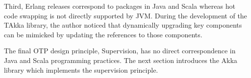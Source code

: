 Third, Erlang releases correspond to  packages in Java and Scala whereas hot 
code swapping is not directly supported by JVM.  During the development of the 
TAkka library, the author noticed that dynamically upgrading key components can 
be mimicked by updating the references to those components.

The final OTP design principle, Supervision, has no direct correspondence in 
Java and Scala programming practices.  The next section introduces the Akka 
library which implements the supervision principle.






\begin{comment}

\section{The Erlang Programming Language}

Erlang \citep{erlang_history, ArmstrongErlang} is a dynamically typed 
functional programming language originally designed at the Ericsson Computer 
Science Laboratory for implementing telephony applications 
\citep{erlang_history}.  After using the Erlang language for in-house 
applications for ten years, when Erlang was released as open source in 1998, 
Erlang developers summarised five design principles shipped with the Erlang/OTP 
library, which stands for Erlang Open Telecom Platform \citep{erlang_history, 
OTP}.

Erlang, collaborates with other languages, provides fault-tolerant support for 
enterprise-level distributed real-time applications. One of the early OTP 
applications, Ericsson’s AXD 301 switch, is reported to have achieved nine “9”s 
availability, that is 99.9999999\% of uptime, during the nine months experiment 
\citep{ArmstrongAXD}.  Up to the present, 
Erlang has been widely used in database systems (e.g. Mnesia, Riak, and Amazon 
SimpleDB) and messaging services (e.g. RabbitMQ and WhatsApp).

This section gives a brief introduction to the Erlang programming language and 
OTP design principles, based on related material in \citep{ArmstrongErlang} and 
\citep{ErlangManual, ErlangStart, OTP}.




\subsection{Actor Programming in Erlang}


\end{comment}
